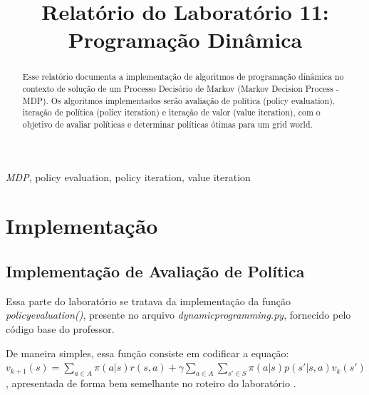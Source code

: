 \documentclass[conference]{IEEEtran}
\begin{document}
\title{Relatório do Laboratório 11: \\ Programação Dinâmica\\
}

\author{
}

\maketitle

\begin{abstract}
Esse relatório documenta a implementação de algoritmos de programação dinâmica no contexto de solução de um Processo Decisório de Markov (Markov Decision Process - MDP). Os algoritmos implementados serão avaliação de política (policy evaluation), iteração de política (policy iteration) e iteração de valor (value iteration), com o objetivo de avaliar políticas e determinar políticas ótimas para um grid world.
\end{abstract}

\begin{IEEEkeywords}
\textit{MDP}, policy evaluation, policy iteration, value iteration
\end{IEEEkeywords}

\section{Implementação}

\subsection{Implementação de Avaliação de Política}
Essa parte do laboratório se tratava da implementação da função \textit{policy\underline{\space}evaluation()}, presente no arquivo \textit{dynamic\underline{\space}programming.py}, fornecido pelo código base do professor. 

De maneira simples, essa função consiste em codificar a equação: $v_{k+1}\left ( s \right ) = \sum_{a\in A} \pi \left ( a|s \right ) r \left ( s, a \right ) + \gamma \sum_{a\in A} \sum_{s'\in S} \pi \left ( a|s \right ) p \left ( s' | s, a \right ) v_k \left ( s' \right )$, apresentada de forma bem semelhante no roteiro do laboratório \cite{roteiro}.
\end{document}
